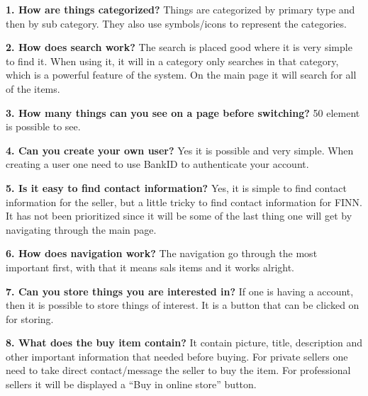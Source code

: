 \textbf{1.  How are things categorized?}
Things are categorized by primary type and then by sub category. They also use symbols/icons to represent the categories. 

\textbf{2.  How does search work?}
The search is placed good where it is very simple
to find it. When using it, it will in a category only searches in that category, which is a powerful feature of the system. On the main page it will search for all of the items. 

\textbf{3.  How many things can you see on a page before switching?}
50 element is possible to see. 

\textbf{4.  Can you create your own user?}
Yes it is possible and very simple. When creating a user one need to use BankID to authenticate your account.

\textbf{5.  Is it easy to find contact information?}
Yes, it is simple to find contact information for the seller, but a little tricky to find contact information for FINN. It has not been prioritized since it will be some of the last thing one will get by navigating through the main page. 

\textbf{6.  How does navigation work?}
The navigation go through the most important first, with that it means sals items and it works alright. 

\textbf{7.  Can you store things you are interested in?}
If one is having a account, then it is possible to store things of interest. It is a button that can be clicked on for storing. 

\textbf{8.  What does the buy item contain?}
It contain picture, title, description and other important information that needed before buying. For private sellers one need to take direct contact/message the seller to buy the item. For professional sellers it will be displayed a “Buy in online store” button.


